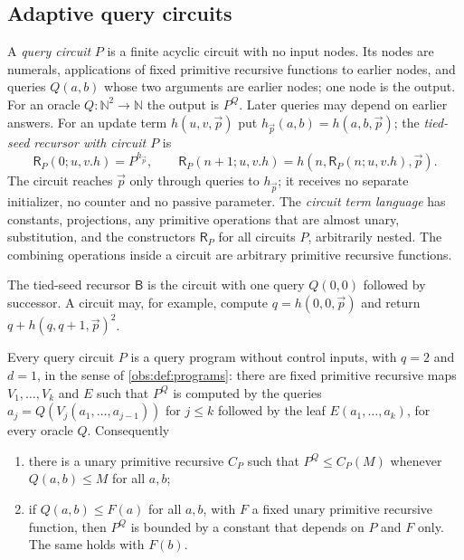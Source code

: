 \subsection{Adaptive query circuits}

\begin{definition}
\label{obs:def:circuit}
A \emph{query circuit} $P$ is a finite acyclic circuit with no input nodes. Its
nodes are numerals, applications of fixed primitive recursive functions to
earlier nodes, and queries $\mathit{Q}(a,b)$ whose two arguments are earlier
nodes; one node is the output. For an oracle
$\mathit{Q}\colon\mathbb{N}^2\to\mathbb{N}$ the output is $P^{\mathit{Q}}$.
Later queries may depend on earlier answers. For an update term
$h(u,v,\vec p)$ put $h_{\vec p}(a,b)=h(a,b,\vec p)$; the \emph{tied-seed
recursor with circuit $P$} is
\[
\mathsf{R}_P(0;u,v.h)=P^{h_{\vec p}},\qquad
\mathsf{R}_P(n+1;u,v.h)=h(n,\mathsf{R}_P(n;u,v.h),\vec p).
\]
The circuit reaches $\vec p$ only through queries to $h_{\vec p}$; it receives
no separate initializer, no counter and no passive parameter. The
\emph{circuit term language} has constants, projections, any primitive
operations that are almost unary, substitution, and the constructors
$\mathsf{R}_P$ for all circuits $P$, arbitrarily nested. The combining
operations inside a circuit are arbitrary primitive recursive functions.
\end{definition}

The tied-seed recursor $\mathsf{B}$ is the circuit with one query
$\mathit{Q}(0,0)$ followed by successor. A circuit may, for example, compute
$q=h(0,0,\vec p)$ and return $q+h(q,q+1,\vec p)^2$.

\begin{lemma}
\label{obs:lem:circuit}
Every query circuit $P$ is a query program without control inputs, with $q=2$
and $d=1$, in the sense of \cref{obs:def:programs}: there are fixed primitive
recursive maps $V_1,\dots,V_k$ and $E$ such that $P^{\mathit{Q}}$ is computed by
the queries $a_j=\mathit{Q}(V_j(a_1,\dots,a_{j-1}))$ for $j\le k$ followed by
the leaf $E(a_1,\dots,a_k)$, for every oracle $\mathit{Q}$. Consequently
\begin{enumerate}[label=(\roman*)]
\item there is a unary primitive recursive $C_P$ such that
$P^{\mathit{Q}}\le C_P(M)$ whenever $\mathit{Q}(a,b)\le M$ for all $a,b$;
\item if $\mathit{Q}(a,b)\le F(a)$ for all $a,b$, with $F$ a fixed unary
primitive recursive function, then $P^{\mathit{Q}}$ is bounded by a constant
that depends on $P$ and $F$ only. The same holds with $F(b)$.
\end{enumerate}
\end{lemma}

